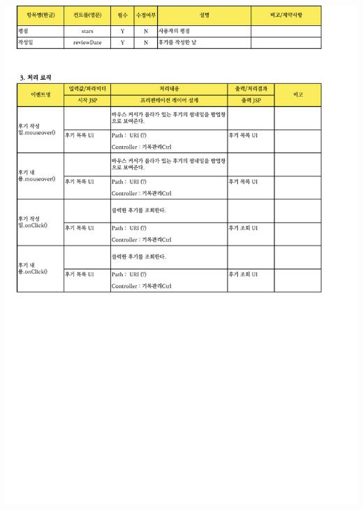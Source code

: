 {{{{{{{{{{{{{{{{{{{{{{{{{{{{{{{{{\includegraphics[width=20cm]{./Figure/Analysis/Display/review/review_08.pdf} \\
}}}}}}}}}}}}}}}}}}}}}}}}}}}}}}}}}
